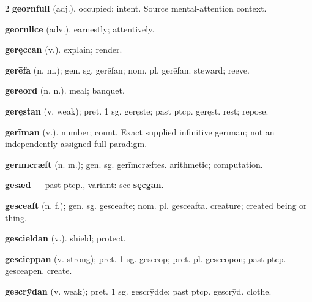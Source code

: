 \begin{multicols*}{2}
\textbf{geornfull} (adj.). occupied; intent. Source mental-attention context.\par
\textbf{geornlice} (adv.). earnestly; attentively.\par
\textbf{geręccan} (v.). explain; render.\par
\textbf{gerēfa} (n. m.); gen. sg. gerēfan; nom. pl. gerēfan. steward; reeve.\par
\textbf{gereord} (n. n.). meal; banquet.\par
\textbf{geręstan} (v. weak); pret. 1 sg. geręste; past ptcp. geręst. rest; repose.\par
\textbf{gerīman} (v.). number; count. Exact supplied infinitive gerīman; not an independently assigned full paradigm.\par
\textbf{gerīmcræft} (n. m.); gen. sg. gerīmcræftes. arithmetic; computation.\par
\textbf{gesǣd} — past ptcp., variant: see \textbf{sęcgan}.\par
\textbf{gesceaft} (n. f.); gen. sg. gesceafte; nom. pl. gesceafta. creature; created being or thing.\par
\textbf{gescieldan} (v.). shield; protect.\par
\textbf{gescieppan} (v. strong); pret. 1 sg. gescēop; pret. pl. gescēopon; past ptcp. gesceapen. create.\par
\textbf{gescrȳdan} (v. weak); pret. 1 sg. gescrȳdde; past ptcp. gescrȳd. clothe.\par

\end{multicols*}
